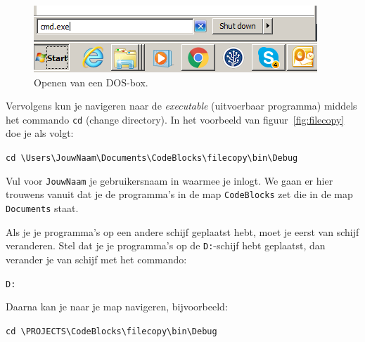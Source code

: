 \documentclass[a4paper,10pt,fleqn,twoside]{article}
\begin{document}
\begin{figure}[!ht]
	\centering
	\includegraphics[scale=0.63]{cmdexe.png}
	\caption{Openen van een DOS-box.}
	\label{fig:cmdexe}
\end{figure}

Vervolgens kun je navigeren naar de \textsl{executable} (uitvoerbaar programma) middels het commando \lstinline|cd| (change directory). In het voorbeeld van figuur~\ref{fig:filecopy} doe je als volgt:

\lstinline|cd \Users\JouwNaam\Documents\CodeBlocks\filecopy\bin\Debug|

Vul voor \lstinline|JouwNaam| je gebruikersnaam in waarmee je inlogt. We gaan er hier trouwens vanuit dat je de programma's in de map \lstinline|CodeBlocks| zet die in de map \lstinline|Documents| staat.

Als je je programma's op een andere schijf geplaatst hebt, moet je eerst van schijf veranderen.  Stel dat je je programma's op de \lstinline|D:|-schijf hebt geplaatst, dan verander je van schijf met het commando:

\lstinline|D:|

Daarna kan je naar je map navigeren, bijvoorbeeld:

\lstinline|cd \PROJECTS\CodeBlocks\filecopy\bin\Debug|
\end{document}

